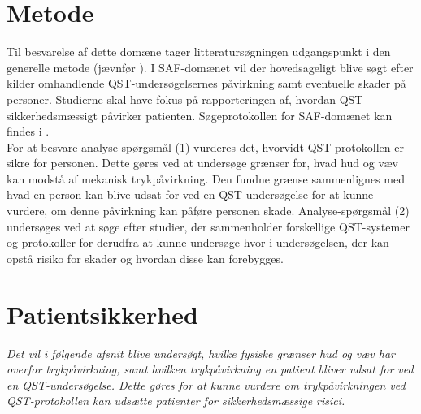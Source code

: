 \section{Metode}
Til besvarelse af dette domæne tager litteratursøgningen udgangspunkt i den generelle metode (jævnfør ). I SAF-domænet vil der hovedsageligt blive søgt efter kilder omhandlende QST-undersøgelsernes påvirkning samt eventuelle skader på personer. Studierne skal have fokus på rapporteringen af, hvordan QST sikkerhedsmæssigt påvirker patienten. Søgeprotokollen for SAF-domænet kan findes i . \\
For at besvare analyse-spørgsmål (1) vurderes det, hvorvidt QST-protokollen er sikre for personen. Dette gøres ved at undersøge grænser for, hvad hud og væv kan modstå af mekanisk trykpåvirkning. Den fundne grænse sammenlignes med hvad en person kan blive udsat for ved en QST-undersøgelse for at kunne vurdere, om denne påvirkning kan påføre personen skade. Analyse-spørgsmål (2) undersøges ved at søge efter studier, der sammenholder forskellige QST-systemer og protokoller for derudfra at kunne undersøge hvor i undersøgelsen, der kan opstå risiko for skader og hvordan disse kan forebygges. 

\section{Patientsikkerhed}
\textit{Det vil i følgende afsnit blive undersøgt, hvilke fysiske grænser hud og væv har overfor trykpåvirkning, samt hvilken trykpåvirkning en patient bliver udsat for ved en QST-undersøgelse. Dette gøres for at kunne vurdere om trykpåvirkningen ved QST-protokollen kan udsætte patienter for sikkerhedsmæssige risici.}


